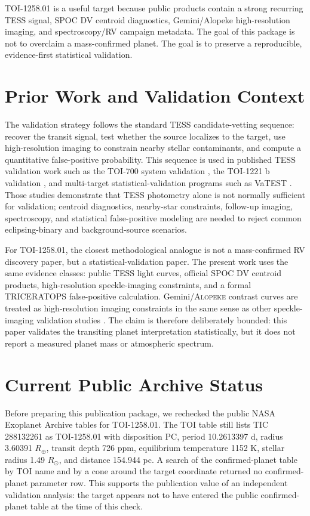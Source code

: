 \documentclass[11pt]{article}
\begin{document}
TOI-1258.01 is a useful target because public products contain a strong recurring TESS signal, SPOC DV centroid diagnostics, Gemini/Alopeke high-resolution imaging, and spectroscopy/RV campaign metadata. The goal of this package is not to overclaim a mass-confirmed planet. The goal is to preserve a reproducible, evidence-first statistical validation.

\section{Prior Work and Validation Context}
The validation strategy follows the standard TESS candidate-vetting sequence:
recover the transit signal, test whether the source localizes to the target,
use high-resolution imaging to constrain nearby stellar contaminants, and
compute a quantitative false-positive probability. This sequence is used in
published TESS validation work such as the TOI-700 system validation
\cite{Gilbert2020}, the TOI-1221 b validation \cite{Mann2023TOI1221}, and
multi-target statistical-validation programs such as VaTEST
\cite{Mistry2023VaTEST2}. Those studies demonstrate that TESS photometry alone
is not normally sufficient for validation; centroid diagnostics, nearby-star
constraints, follow-up imaging, spectroscopy, and statistical false-positive
modeling are needed to reject common eclipsing-binary and background-source
scenarios.

For TOI-1258.01, the closest methodological analogue is not a mass-confirmed
RV discovery paper, but a statistical-validation paper. The present work uses
the same evidence classes: public TESS light curves, official SPOC DV centroid
products, high-resolution speckle-imaging constraints, and a formal
TRICERATOPS false-positive calculation. Gemini/\textsc{Alopeke} contrast
curves are treated as high-resolution imaging constraints in the same sense as
other speckle-imaging validation studies \cite{Howell2021,Scott2019}. The
claim is therefore deliberately bounded: this paper validates the transiting
planet interpretation statistically, but it does not report a measured planet
mass or atmospheric spectrum.

\section{Current Public Archive Status}
Before preparing this publication package, we rechecked the public NASA
Exoplanet Archive tables for TOI-1258.01. The TOI table still lists TIC
288132261 as TOI-1258.01 with disposition PC, period 10.2613397 d, radius
3.60391 $R_{\oplus}$, transit depth 726 ppm, equilibrium temperature 1152 K,
stellar radius 1.49 $R_{\odot}$, and distance 154.944 pc. A search of the
confirmed-planet table by TOI name and by a cone around the target coordinate
returned no confirmed-planet parameter row. This supports the publication
value of an independent validation analysis: the target appears not to have
entered the public confirmed-planet table at the time of this check.
\end{document}
